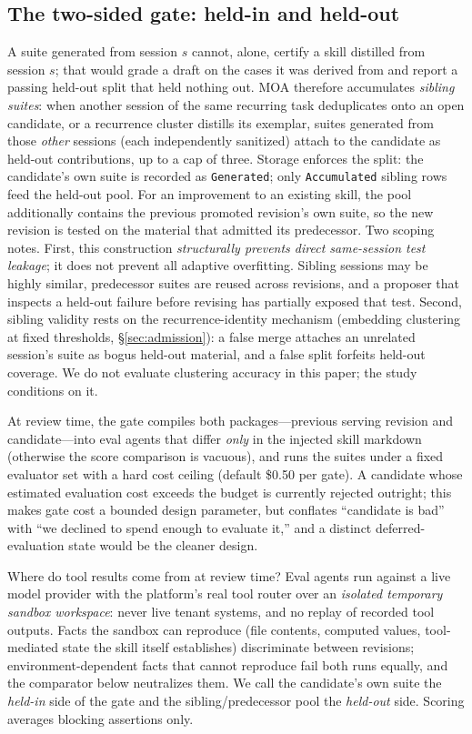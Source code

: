 \documentclass{article}
\newcommand{\moa}{MOA}
\newcommand{\code}[1]{\texttt{\small #1}}
\begin{document}
\subsection{The two-sided gate: held-in and held-out}
\label{sec:gate}

A suite generated from session $s$ cannot, alone, certify a skill distilled from session $s$; that would grade a draft on the cases it was derived from and report a passing held-out split that held nothing out. \moa{} therefore accumulates \emph{sibling suites}: when another session of the same recurring task deduplicates onto an open candidate, or a recurrence cluster distills its exemplar, suites generated from those \emph{other} sessions (each independently sanitized) attach to the candidate as held-out contributions, up to a cap of three. Storage enforces the split: the candidate's own suite is recorded as \code{Generated}; only \code{Accumulated} sibling rows feed the held-out pool. For an improvement to an existing skill, the pool additionally contains the previous promoted revision's own suite, so the new revision is tested on the material that admitted its predecessor. Two scoping notes. First, this construction \emph{structurally prevents direct same-session test leakage}; it does not prevent all adaptive overfitting. Sibling sessions may be highly similar, predecessor suites are reused across revisions, and a proposer that inspects a held-out failure before revising has partially exposed that test. Second, sibling validity rests on the recurrence-identity mechanism (embedding clustering at fixed thresholds, \S\ref{sec:admission}): a false merge attaches an unrelated session's suite as bogus held-out material, and a false split forfeits held-out coverage. We do not evaluate clustering accuracy in this paper; the study conditions on it.

At review time, the gate compiles both packages---previous serving revision and candidate---into eval agents that differ \emph{only} in the injected skill markdown (otherwise the score comparison is vacuous), and runs the suites under a fixed evaluator set with a hard cost ceiling (default \$0.50 per gate). A candidate whose estimated evaluation cost exceeds the budget is currently rejected outright; this makes gate cost a bounded design parameter, but conflates ``candidate is bad'' with ``we declined to spend enough to evaluate it,'' and a distinct deferred-evaluation state would be the cleaner design.

Where do tool results come from at review time? Eval agents run against a live model provider with the platform's real tool router over an \emph{isolated temporary sandbox workspace}: never live tenant systems, and no replay of recorded tool outputs. Facts the sandbox can reproduce (file contents, computed values, tool-mediated state the skill itself establishes) discriminate between revisions; environment-dependent facts that cannot reproduce fail both runs equally, and the comparator below neutralizes them. We call the candidate's own suite the \emph{held-in} side of the gate and the sibling/predecessor pool the \emph{held-out} side. Scoring averages blocking assertions only.
\end{document}
